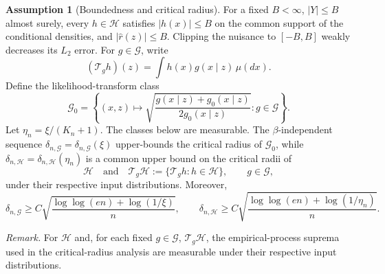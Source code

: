 \documentclass[12pt]{article}
\theoremstyle{plain}
\theoremstyle{definition}
\newtheorem{assumption}[theorem]{Assumption}
\theoremstyle{remark}
\begin{document}
\begin{assumption}[Boundedness and critical radius]\label{asp:cr_deepiv}
For a fixed $B<\infty$, $|Y|\leqslant B$ almost surely, every $h\in\mathcal H$ satisfies $|h(x)|\leqslant B$ on the common support of the conditional densities, and $|\hat r(z)|\leqslant B$. Clipping the nuisance to $[-B,B]$ weakly decreases its $L_2$ error. For $g\in\mathcal G$, write
\[
(\mathcal T_g h)(z)=\int h(x)g(x\mid z)\,\mu(dx).
\]
Define the likelihood-transform class
\[
\mathcal G_0=
\left\{(x,z)\mapsto
\sqrt{\frac{g(x\mid z)+g_0(x\mid z)}{2g_0(x\mid z)}}:
g\in\mathcal G\right\}.
\]
Let $\eta_n=\xi/(K_n+1)$. The classes below are measurable. The $\beta$-independent sequence $\delta_{n,\mathcal G}=\delta_{n,\mathcal G}(\xi)$ upper-bounds the critical radius of $\mathcal G_0$, while $\delta_{n,\mathcal H}=\delta_{n,\mathcal H}(\eta_n)$ is a common upper bound on the critical radii of
\[
\mathcal H
\quad\text{and}\quad
\mathcal T_g\mathcal H:=\{\mathcal T_g h:h\in\mathcal H\},
\qquad g\in\mathcal G,
\]
under their respective input distributions. Moreover,
\[
\delta_{n,\mathcal G}\geqslant
C\sqrt{\frac{\log\log(en)+\log(1/\xi)}{n}},
\qquad
\delta_{n,\mathcal H}\geqslant
C\sqrt{\frac{\log\log(en)+\log(1/\eta_n)}{n}}.
\]
\end{assumption}

\noindent\textit{Remark.} For $\mathcal H$ and, for each fixed $g\in\mathcal G$, $\mathcal T_g\mathcal H$, the empirical-process suprema used in the critical-radius analysis are measurable under their respective input distributions.
\end{document}
